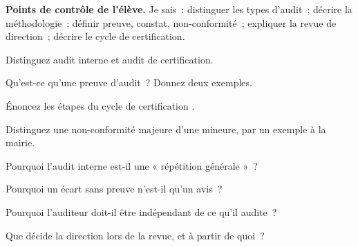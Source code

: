 \begin{boxinfo}
\textbf{Points de contrôle de l'élève.} Je sais~: distinguer les types
d'audit~; décrire la méthodologie~; définir preuve, constat, non-conformité~;
expliquer la revue de direction~; décrire le cycle de certification.
\end{boxinfo}

\bigskip

\begin{boxexo}[title={\ding{45}\quad Exercice~19.1. Types d'audit \niveaubase}]
Distinguez audit interne et audit de certification.
\end{boxexo}

\begin{boxexo}[title={\ding{45}\quad Exercice~19.2. Preuve \niveaubase}]
Qu'est-ce qu'une preuve d'audit~? Donnez deux exemples.
\end{boxexo}

\begin{boxexo}[title={\ding{45}\quad Exercice~19.3. Le cycle \niveaubase}]
Énoncez les étapes du cycle de certification .
\end{boxexo}

\begin{boxexo}[title={\ding{45}\quad Exercice~19.4. Majeure ou mineure \niveaumoyen}]
Distinguez une non-conformité majeure d'une mineure, par un exemple à la
mairie.
\end{boxexo}

\begin{boxexo}[title={\ding{45}\quad Exercice~19.5. Répétition générale \niveaumoyen}]
Pourquoi l'audit interne est-il une « répétition générale »~?
\end{boxexo}

\begin{boxexo}[title={\ding{45}\quad Exercice~19.6. Constat sans preuve \niveaumoyen}]
Pourquoi un écart sans preuve n'est-il qu'un avis~?
\end{boxexo}

\begin{boxexo}[title={\ding{45}\quad Exercice~19.7. Indépendance \niveaumoyen}]
Pourquoi l'auditeur doit-il être indépendant de ce qu'il audite~?
\end{boxexo}

\begin{boxexo}[title={\ding{45}\quad Exercice~19.8. Revue de direction \niveaumoyen}]
Que décide la direction lors de la revue, et à partir de quoi~?
\end{boxexo}

